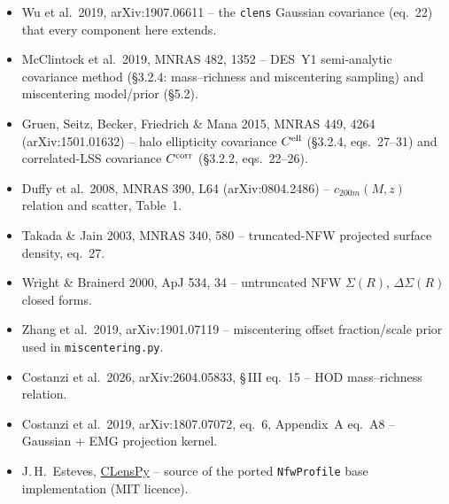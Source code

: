 \documentclass[a4paper, 11pt]{article}
\newcommand{\modname}[1]{\textcolor{kwcol}{\texttt{#1}}}
\newcommand{\pyfile}[1]{{\small\texttt{#1}}}
\begin{document}
\begin{itemize}
  \setlength\itemsep{1pt}
  \item Wu et al.\ 2019, arXiv:1907.06611 -- the \modname{clens}
    Gaussian covariance (eq.~22) that every component here extends.
  \item McClintock et al.\ 2019, MNRAS 482, 1352 -- DES~Y1 semi-analytic
    covariance method (\S3.2.4: mass--richness and miscentering
    sampling) and miscentering model/prior (\S5.2).
  \item Gruen, Seitz, Becker, Friedrich \& Mana 2015, MNRAS 449, 4264
    (arXiv:1501.01632) -- halo ellipticity covariance $C^{\rm ell}$
    (\S3.2.4, eqs.~27--31) and correlated-LSS covariance $C^{\rm corr}$
    (\S3.2.2, eqs.~22--26).
  \item Duffy et al.\ 2008, MNRAS 390, L64 (arXiv:0804.2486) --
    $c_{200m}(M,z)$ relation and scatter, Table~1.
  \item Takada \& Jain 2003, MNRAS 340, 580 -- truncated-NFW projected
    surface density, eq.~27.
  \item Wright \& Brainerd 2000, ApJ 534, 34 -- untruncated NFW
    $\Sigma(R)$, $\Delta\Sigma(R)$ closed forms.
  \item Zhang et al.\ 2019, arXiv:1901.07119 -- miscentering offset
    fraction/scale prior used in \pyfile{miscentering.py}.
  \item Costanzi et al.\ 2026, arXiv:2604.05833, \S\,III eq.~15 --
    HOD mass--richness relation.
  \item Costanzi et al.\ 2019, arXiv:1807.07072, eq.~6, Appendix~A
    eq.~A8 -- Gaussian + EMG projection kernel.
  \item J.\,H.\ Esteves, \href{https://github.com/estevesjh/CLensPy}{CLensPy}
    -- source of the ported \texttt{NfwProfile} base implementation
    (MIT licence).
\end{itemize}
\end{document}
